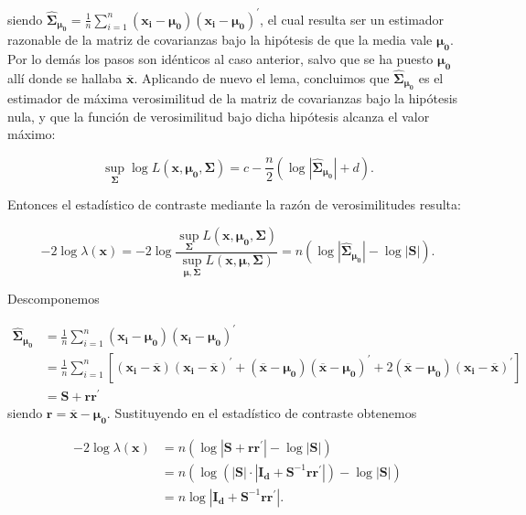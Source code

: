 \documentclass[
  a4paper,
  oneside]{scrbook}
\theoremstyle{definition}
\theoremstyle{definition}
\theoremstyle{definition}
\theoremstyle{definition}
\theoremstyle{remark}
\begin{document}
siendo \(\hat{\bm\Sigma}_{\bm{\mu_0}}=\frac{1}{n}\sum_{i=1}^n
\left(\bm{x_i}-\bm{\mu_0}\right)  \left(\bm{x_i}-\bm{\mu_0}\right)^\prime{}\),
el cual resulta ser un estimador razonable de la matriz de covarianzas
bajo la hipótesis de que la media vale \(\bm{\mu_0}\). Por lo demás los
pasos son idénticos al caso anterior, salvo que se ha puesto
\(\bm{\mu_0}\) allí donde se hallaba \(\overline{\bm{x}}\). Aplicando de
nuevo el lema, concluimos que \(\hat{\bm\Sigma}_{\bm{\mu_0}}\) es el
estimador de máxima verosimilitud de la matriz de covarianzas bajo la
hipótesis nula, y que la función de verosimilitud bajo dicha hipótesis
alcanza el valor máximo:

\[\sup_{\bm\Sigma}\log L(\bm{x},\bm{\mu_0},\bm\Sigma)
= c - \frac{n}{2} \left( \log |\hat{\bm\Sigma}_{\bm{\mu_0}}| + d \right).\]

Entonces el estadístico de contraste mediante la razón de
verosimilitudes resulta:

\[-2\log \lambda(\bm{x})
=-2\log \frac{\sup_{\bm\Sigma} L(\bm{x},\bm{\mu_0},\bm\Sigma)}{\sup_{\bm{\mu},\bm\Sigma} L(\bm{x},\bm{\mu},\bm\Sigma)}
=n\left( \log |\hat{\bm\Sigma}_{\bm{\mu_0}}| - \log |\bm{S}| \right).\]

Descomponemos

\[\begin{aligned}
\hat{\bm\Sigma}_{\bm{\mu_0}} &=
\frac{1}{n} \sum_{i=1}^n \left(\bm{x_i}-\bm{\mu_0}\right) \left(\bm{x_i}-\bm{\mu_0}\right)^\prime{} \\
&= \frac{1}{n} \sum_{i=1}^n \left[ \left(\bm{x_i}-\overline{\bm{x}}\right) \left(\bm{x_i}-\overline{\bm{x}}\right)^\prime{}
 + \left(\overline{\bm{x}}-\bm{\mu_0}\right) \left(\overline{\bm{x}}-\bm{\mu_0}\right)^\prime{}
+ 2 \left(\overline{\bm{x}}-\bm{\mu_0}\right) \left(\bm{x_i}-\overline{\bm{x}}\right)^\prime{} \right] \\
&= \bm{S}+\bm{r}\bm{r}^\prime{}\end{aligned}\]
siendo
\(\bm{r}=\overline{\bm{x}}-\bm{\mu_0}\). Sustituyendo en el estadístico de
contraste obtenemos

\[\begin{aligned}
-2\log \lambda(\bm{x})
&= n\left( \log |\bm{S}+\bm{r}\bm{r}^\prime{}| - \log |\bm{S}| \right) \\
&= n\left( \log \left(|\bm{S}|\cdot \left|\bm{I_d}+\bm{S}^{-1}\bm{r}\bm{r}^\prime{}\right|\right) - \log |\bm{S}| \right)
\\
&=n \log \left|\bm{I_d}+\bm{S}^{-1}\bm{r}\bm{r}^\prime{}\right|.\end{aligned}\]
\end{document}
